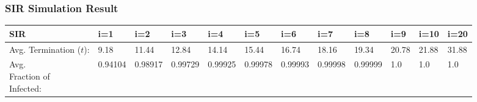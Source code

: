 \documentclass{subfile}
\begin{document}
  \subsubsection{SIR Simulation Result}
  {\small
  \begin{adjustbox}{max width=1.2\textwidth,center}
  \begin{tabular}{|l|l|l|l|l|l|l|l|l|l|l|l|}
    \hline
    SIR & i=1& i=2& i=3& i=4& i=5& i=6& i=7& i=8& i=9& i=10& i=20\\
    \hline
    \makecell{Avg.\\Termination\\(\(t\)):} & 9.18&
11.44&
12.84&
14.14&
15.44&
16.74&
18.16&
19.34&
20.78&
21.88&
31.88\\
    \hline
    \makecell{Avg.\\Fraction of\\ Infected:}&0.94104&
0.98917&
0.99729&
0.99925&
0.99978&
0.99993&
0.99998&
0.99999&
1.0&
1.0&
1.0\\
    \hline
  \end{tabular}
  \end{adjustbox}}
\end{document}
